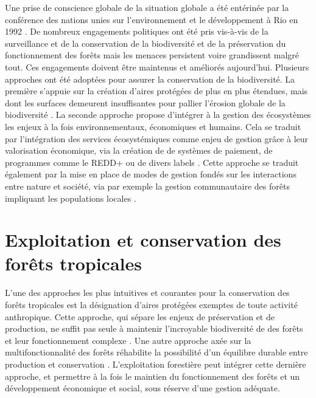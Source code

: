 \documentclass[
  11pt,
  french,
  A4paper,
  extrafontsizes,onecolumn,openright
  ]{memoir}
\begin{document}
Une prise de conscience globale de la situation globale a été entérinée
par la conférence des nations unies sur l'environnement et le
développement à Rio en 1992
\autocites{Schlaepfer2000}{Dirzo2003a}{Morales-Hidalgo2015}. De nombreux
engagements politiques ont été pris vis-à-vis de la surveillance et de
la conservation de la biodiversité et de la préservation du
fonctionnement des forêts mais les menaces persistent voire grandissent
malgré tout. Ces engagements doivent être maintenus et améliorés
aujourd'hui. Plusieurs approches ont été adoptées pour assurer la
conservation de la biodiversité. La première s'appuie sur la création
d'aires protégées de plus en plus étendues, mais dont les surfaces
demeurent insuffisantes pour pallier l'érosion globale de la
biodiversité \autocite{Sist2015}. La seconde approche propose d'intégrer
à la gestion des écosystèmes les enjeux à la fois environnementaux,
économiques et humains. Cela se traduit par l'intégration des services
écosystémiques comme enjeu de gestion grâce à leur valorisation
économique, via la création de de systèmes de paiement, de programmes
comme le REDD+ ou de divers labels \autocites{Agrawal2011}{Barlow2018}.
Cette approche se traduit également par la mise en place de modes de
gestion fondés sur les interactions entre nature et société, via par
exemple la gestion communautaire des forêts impliquant les populations
locales \autocite{Liu2015}.

\section{Exploitation et conservation des forêts
tropicales}\label{exploitation-et-conservation-des-forets-tropicales}

L'une des approches les plus intuitives et courantes pour la
conservation des forêts tropicales est la désignation d'aires protégées
exemptes de toute activité anthropique. Cette approche, qui sépare les
enjeux de préservation et de production, ne suffit pas seule à maintenir
l'incroyable biodiversité de des forêts et leur fonctionnement complexe
\autocite{Sist2015}. Une autre approche axée sur la multifonctionnalité
des forêts réhabilite la possibilité d'un équilibre durable entre
production et conservation \autocite{Loos2018}. L'exploitation
forestière peut intégrer cette dernière approche, et permettre à la fois
le maintien du fonctionnement des forêts et un développement économique
et social, sous réserve d'une gestion adéquate.
\end{document}
